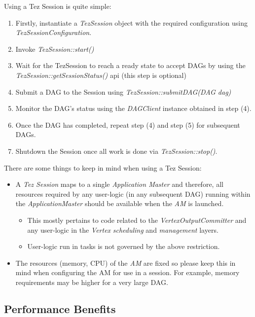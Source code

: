 \documentclass[twocolumn]{article}
\begin{document}
Using a Tez Session is quite simple:

\begin{enumerate}
\item
  Firstly, instantiate a \emph{TezSession} object with the required
  configuration using \emph{TezSessionConfiguration}.
\item
  Invoke \emph{TezSession::start()}
\item
  Wait for the TezSession to reach a ready state to accept DAGs by using
  the \emph{TezSession::getSessionStatus()} api (this step is
  optional)
\item
  Submit a DAG to the Session using
  \emph{TezSession::submitDAG(DAG dag)}
\item
  Monitor the DAG's status using the \emph{DAGClient} instance
  obtained in step (4).
\item
  Once the DAG has completed, repeat step (4) and step (5) for
  subsequent DAGs.
\item
  Shutdown the Session once all work is done via
 \emph{TezSession::stop()}.
\end{enumerate}

There are some things to keep in mind when using a Tez Session:

\begin{itemize}
\item
  A \emph{Tez Session} maps to a single \emph{Application Master}
  and therefore, all resources required by any user-logic (in any
  subsequent DAG) running within the \emph{ApplicationMaster} should
  be available when the \emph{AM} is launched.
  \begin{itemize}
  \item
    This mostly pertains to code related to the
    \emph{VertexOutputCommitter} and any user-logic in the
    \emph{Vertex} \emph{scheduling} and \emph{management} layers.
  \item
    User-logic run in tasks is not governed by the above restriction.
  \end{itemize}
\item
  The resources (memory, CPU) of the \emph{AM} are fixed so please
  keep this in mind when configuring the AM for use in a session. For
  example, memory requirements may be higher for a very large DAG.
\end{itemize}

\subsection{Performance Benefits}
\end{document}
